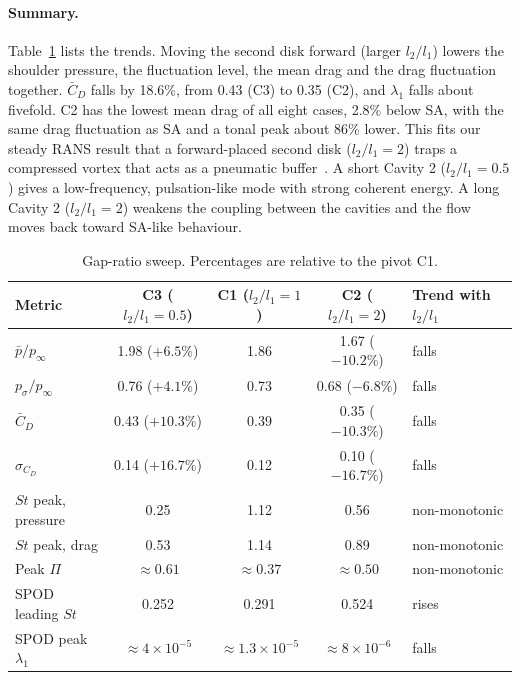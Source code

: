 \documentclass[11pt,a4paper]{article}
\newcommand{\pbar}{\bar{p}/p_\infty}
\newcommand{\psd}{p_\sigma/p_\infty}
\newcommand{\Cdm}{\bar{C}_D}
\newcommand{\sCd}{\sigma_{C_D}}
\newcommand{\ltl}{l_2/l_1}
\begin{document}
\paragraph{Summary.} Table~\ref{tab:gap} lists the trends. Moving the second disk forward (larger $\ltl$) lowers the shoulder pressure, the fluctuation level, the mean drag and the drag fluctuation together. $\Cdm$ falls by 18.6\%, from 0.43 (C3) to 0.35 (C2), and $\lambda_1$ falls about fivefold. C2 has the lowest mean drag of all eight cases, 2.8\% below SA, with the same drag fluctuation as SA and a tonal peak about 86\% lower. This fits our steady RANS result that a forward-placed second disk ($\ltl = 2$) traps a compressed vortex that acts as a pneumatic buffer~\cite{Gujar2026staged}. A short Cavity 2 ($\ltl = 0.5$) gives a low-frequency, pulsation-like mode with strong coherent energy. A long Cavity 2 ($\ltl = 2$) weakens the coupling between the cavities and the flow moves back toward SA-like behaviour.

\begin{table}[htbp]
  \centering
  \caption{Gap-ratio sweep. Percentages are relative to the pivot C1.}
  \label{tab:gap}
  \begin{tabular}{lcccl}
    \toprule
    Metric & C3 ($\ltl = 0.5$) & C1 ($\ltl = 1$) & C2 ($\ltl = 2$) & Trend with $\ltl$ \\
    \midrule
    $\pbar$ & 1.98 ($+6.5\%$) & 1.86 & 1.67 ($-10.2\%$) & falls \\
    $\psd$ & 0.76 ($+4.1\%$) & 0.73 & 0.68 ($-6.8\%$) & falls \\
    $\Cdm$ & 0.43 ($+10.3\%$) & 0.39 & 0.35 ($-10.3\%$) & falls \\
    $\sCd$ & 0.14 ($+16.7\%$) & 0.12 & 0.10 ($-16.7\%$) & falls \\
    $St$ peak, pressure & 0.25 & 1.12 & 0.56 & non-monotonic \\
    $St$ peak, drag & 0.53 & 1.14 & 0.89 & non-monotonic \\
    Peak $\Pi$ & $\approx 0.61$ & $\approx 0.37$ & $\approx 0.50$ & non-monotonic \\
    SPOD leading $St$ & 0.252 & 0.291 & 0.524 & rises \\
    SPOD peak $\lambda_1$ & $\approx 4\times10^{-5}$ & $\approx 1.3\times10^{-5}$ & $\approx 8\times10^{-6}$ & falls \\
    \bottomrule
  \end{tabular}
\end{table}

\end{document}
